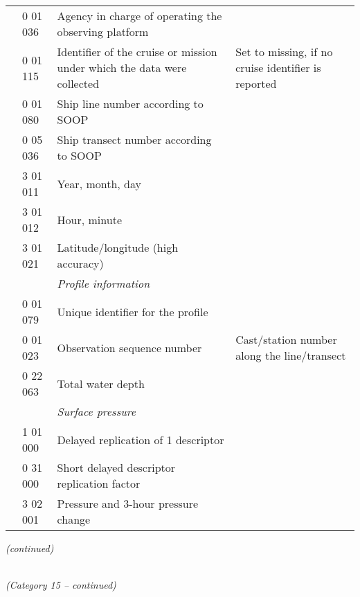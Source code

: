 \begin{longtable}[]{@{}llll@{}}
& 0 01 036 & Agency in charge of operating the observing platform &\tabularnewline
& 0 01 115 & Identifier of the cruise or mission under which the data were collected & Set to missing, if no cruise identifier is reported\tabularnewline
& 0 01 080 & Ship line number according to SOOP &\tabularnewline
& 0 05 036 & Ship transect number according to SOOP &\tabularnewline
& 3 01 011 & Year, month, day &\tabularnewline
& 3 01 012 & Hour, minute &\tabularnewline
& 3 01 021 & Latitude/longitude (high accuracy) &\tabularnewline
& & \emph{Profile information} &\tabularnewline
& 0 01 079 & Unique identifier for the profile &\tabularnewline
& 0 01 023 & Observation sequence number & Cast/station number along the line/transect\tabularnewline
& 0 22 063 & Total water depth &\tabularnewline
& & \emph{Surface pressure} &\tabularnewline
& 1 01 000 & Delayed replication of 1 descriptor &\tabularnewline
& 0 31 000 & Short delayed descriptor replication factor &\tabularnewline
& 3 02 001 & Pressure and 3-hour pressure change &\tabularnewline
\bottomrule
\end{longtable}

\emph{(continued)}

\emph{\\
(Category 15 -- continued)}

